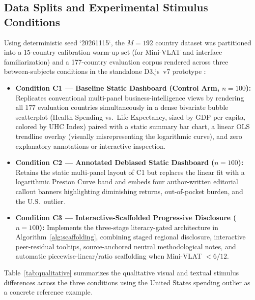 \documentclass[conference]{IEEEtran}
\newcommand{\WdiM}{192}
\newcommand{\WdiEvalM}{177}
\begin{document}
\subsection{Data Splits and Experimental Stimulus Conditions}
Using deterministic seed `20261115`, the $M = \WdiM$ country dataset was partitioned into a 15-country calibration warm-up set (for Mini-VLAT and interface familiarization) and a \WdiEvalM-country evaluation corpus rendered across three between-subjects conditions in the standalone D3.js~v7 prototype \cite{repo}:
\begin{itemize}
\item \textbf{Condition C1 --- Baseline Static Dashboard (Control Arm, $n = 100$):} Replicates conventional multi-panel business-intelligence views by rendering all \WdiEvalM{} evaluation countries simultaneously in a dense bivariate bubble scatterplot (Health Spending vs.\ Life Expectancy, sized by GDP per capita, colored by UHC Index) paired with a static summary bar chart, a linear OLS trendline overlay (visually misrepresenting the logarithmic curve), and zero explanatory annotations or interactive inspection.
\item \textbf{Condition C2 --- Annotated Debiased Static Dashboard ($n = 100$):} Retains the static multi-panel layout of C1 but replaces the linear fit with a logarithmic Preston Curve band and embeds four author-written editorial callout banners highlighting diminishing returns, out-of-pocket burden, and the U.S.\ outlier.
\item \textbf{Condition C3 --- Interactive-Scaffolded Progressive Disclosure ($n = 100$):} Implements the three-stage literacy-gated architecture in Algorithm~\ref{alg:scaffolding}, combining staged regional disclosure, interactive peer-residual tooltips, source-anchored neutral methodological notes, and automatic piecewise-linear/ratio scaffolding when Mini-VLAT $< 6/12$.
\end{itemize}

Table~\ref{tab:qualitative} summarizes the qualitative visual and textual stimulus differences across the three conditions using the United States spending outlier as a concrete reference example.
\end{document}
